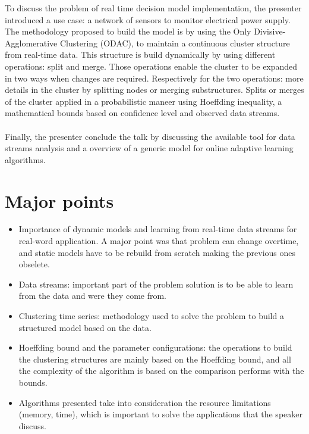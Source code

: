 \documentclass[11pt,a4paper]{article}
\begin{document}
To discuss the problem of real time decision model implementation, the presenter introduced a use case: a network of sensors to monitor electrical power supply. The methodology proposed to build the model is by using the Only Divisive-Agglomerative Clustering (ODAC), to maintain a continuous cluster structure from real-time data. This structure is build dynamically by using different operations: split and merge. Those operations enable the cluster to be expanded in two ways when changes are required. Respectively for the two operations: more details in the cluster by splitting nodes or merging substructures. Splits or merges of the cluster applied in a probabilistic maneer using Hoeffding inequality, a mathematical bounds based on confidence level and observed data streams.

\paragraph{}


Finally, the presenter conclude the talk by discussing the available tool for data streams analysis and a overview of a generic model for online adaptive learning algorithms.

\section{Major points}


\begin{itemize}
  \item Importance of dynamic models and learning from real-time data streams for real-word application. A major point was that problem can change overtime, and static models have to be rebuild from scratch making the previous ones obselete.
  \item Data streams: important part of the problem solution is to be able to learn from the data and were they come from.
  \item Clustering time series: methodology used to solve the problem to build a structured model based on the data.
  \item Hoeffding bound and the parameter configurations: the operations to build the clustering structures are mainly based on the Hoeffding bound, and all the complexity of the algorithm is based on the comparison performs with the bounds.
  \item Algorithms presented take into consideration the resource limitations (memory, time), which is important to solve the applications that the speaker discuss.
\end{itemize}
\end{document}
